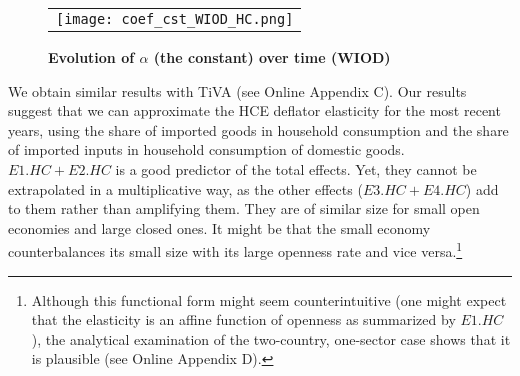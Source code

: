 \documentclass[12pt,a4paper]{paper}
\begin{document}
\begin{figure}[H]
\centering
\caption{\footnotesize{\textbf{Evolution of $\alpha$ (the constant) over time (WIOD)}}}
\begin{tabular}{c}
\texttt{[image: coef\_cst\_WIOD\_HC.png]}\\
\end{tabular}
\label{fig:evolution_cst}
\end{figure}


We obtain similar results with TiVA (see Online Appendix C). 
Our results suggest that we can approximate the HCE deflator elasticity for the most recent years, using the share of imported goods in household consumption and the share of imported inputs in household consumption of domestic goods. $E1.HC+E2.HC$ is a good predictor of the total effects.
Yet, they cannot be extrapolated in a multiplicative way, as the other effects ($E3.HC+E4.HC$) add to them rather than amplifying them.
They are of similar size for small open economies and large closed ones.
It might be that the small economy counterbalances its small size with its large openness rate and vice versa.\footnote{Although this functional form might seem counterintuitive (one might expect that the elasticity is an affine function of openness as summarized by $E1.HC$), the analytical examination of the two-country, one-sector case shows that it is plausible (see Online Appendix D).}
\end{document}
